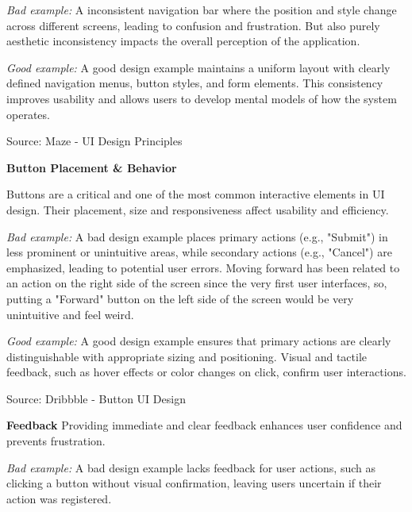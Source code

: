 \blankLine

\textit{Bad example:}
A inconsistent navigation bar where the position and style change across different screens, leading to confusion and frustration. But also purely aesthetic inconsistency impacts the overall perception of the application. 

\blankLine

\textit{Good example:}
A good design example maintains a uniform layout with clearly defined navigation menus, button styles, and form elements. This consistency improves usability and allows users to develop mental models of how the system operates.

\blankLine

Source: Maze - UI Design Principles

\blankLine

\textbf{Button Placement \& Behavior}

Buttons are a critical and one of the most common interactive elements in UI design. Their placement, size and responsiveness affect usability and efficiency.

\blankLine

\textit{Bad example:}
A bad design example places primary actions (e.g., "Submit") in less prominent or unintuitive areas, while secondary actions (e.g., "Cancel") are emphasized, leading to potential user errors. Moving forward has been related to an action on the right side of the screen since the very first user interfaces, so, putting a "Forward" button on the left side of the screen would be very unintuitive and feel weird. 

\blankLine

\textit{Good example:}
A good design example ensures that primary actions are clearly distinguishable with appropriate sizing and positioning. Visual and tactile feedback, such as hover effects or color changes on click, confirm user interactions.

\blankLine

Source: Dribbble - Button UI Design

\blankLine

\textbf{Feedback}
Providing immediate and clear feedback enhances user confidence and prevents frustration.

\blankLine

\textit{Bad example:}
A bad design example lacks feedback for user actions, such as clicking a button without visual confirmation, leaving users uncertain if their action was registered.

